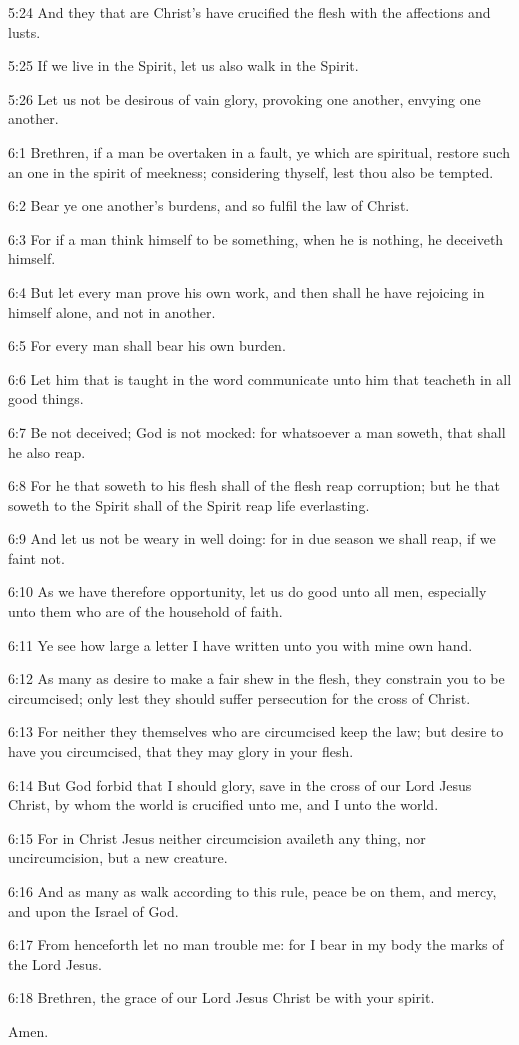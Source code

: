 5:24 And they that are Christ's have crucified the flesh with the
affections and lusts.

5:25 If we live in the Spirit, let us also walk in the Spirit.

5:26 Let us not be desirous of vain glory, provoking one another,
envying one another.

6:1 Brethren, if a man be overtaken in a fault, ye which are
spiritual, restore such an one in the spirit of meekness; considering
thyself, lest thou also be tempted.

6:2 Bear ye one another's burdens, and so fulfil the law of Christ.

6:3 For if a man think himself to be something, when he is nothing, he
deceiveth himself.

6:4 But let every man prove his own work, and then shall he have
rejoicing in himself alone, and not in another.

6:5 For every man shall bear his own burden.

6:6 Let him that is taught in the word communicate unto him that
teacheth in all good things.

6:7 Be not deceived; God is not mocked: for whatsoever a man soweth,
that shall he also reap.

6:8 For he that soweth to his flesh shall of the flesh reap
corruption; but he that soweth to the Spirit shall of the Spirit reap
life everlasting.

6:9 And let us not be weary in well doing: for in due season we shall
reap, if we faint not.

6:10 As we have therefore opportunity, let us do good unto all men,
especially unto them who are of the household of faith.

6:11 Ye see how large a letter I have written unto you with mine own
hand.

6:12 As many as desire to make a fair shew in the flesh, they
constrain you to be circumcised; only lest they should suffer
persecution for the cross of Christ.

6:13 For neither they themselves who are circumcised keep the law; but
desire to have you circumcised, that they may glory in your flesh.

6:14 But God forbid that I should glory, save in the cross of our Lord
Jesus Christ, by whom the world is crucified unto me, and I unto the
world.

6:15 For in Christ Jesus neither circumcision availeth any thing, nor
uncircumcision, but a new creature.

6:16 And as many as walk according to this rule, peace be on them, and
mercy, and upon the Israel of God.

6:17 From henceforth let no man trouble me: for I bear in my body the
marks of the Lord Jesus.

6:18 Brethren, the grace of our Lord Jesus Christ be with your spirit.

Amen.

